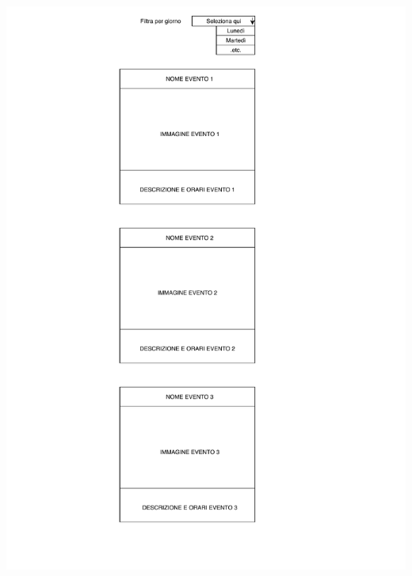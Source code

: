 \begin{center}
\begin{minipage}{0.4\linewidth}
            \includegraphics[width=\linewidth]{./../docs/Analisi/bozze/Eventi.pdf}
        \end{minipage}%
        \hfill
        \begin{minipage}{0.4\linewidth}

\end{minipage}
\end{center}
